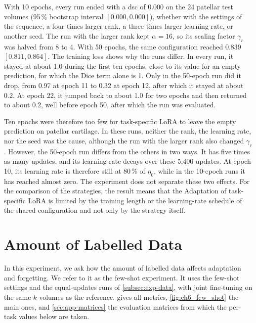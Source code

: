 With 10 epochs, every run ended with a \gls{dsc} of 0.000 on the 24 patellar test volumes (95\,\% bootstrap interval $[0.000, 0.000]$), whether with the settings of the sequence, a four times larger rank, a three times larger learning rate, or another seed.
The run with the larger rank kept $\alpha = 16$, so its scaling factor $\gamma_r$ was halved from 8 to 4.
With 50 epochs, the same configuration reached 0.839 $[0.811, 0.864]$.
The training loss shows why the runs differ.
In every run, it stayed at about 1.0 during the first ten epochs, close to its value for an empty prediction, for which the Dice term alone is 1.
Only in the 50-epoch run did it drop, from 0.97 at epoch 11 to 0.32 at epoch 12, after which it stayed at about 0.2.
At epoch 22, it jumped back to about 1.0 for two epochs and then returned to about 0.2, well before epoch 50, after which the run was evaluated.

Ten epochs were therefore too few for task-specific LoRA to leave the empty prediction on patellar cartilage.
In these runs, neither the rank, the learning rate, nor the seed was the cause, although the run with the larger rank also changed $\gamma_r$.
However, the 50-epoch run differs from the others in two ways.
It has five times as many updates, and its learning rate decays over these 5{,}400 updates.
At epoch 10, its learning rate is therefore still at 80\,\% of $\eta_0$, while in the 10-epoch runs it has reached almost zero.
The experiment does not separate these two effects.
For the comparison of the strategies, the result means that the Adaptation of task-specific LoRA is limited by the training length or the learning-rate schedule of the shared configuration and not only by the strategy itself.

\section{Amount of Labelled Data}
\label{sec:exp-few-shot}
In this experiment, we ask how the amount of labelled data affects adaptation and forgetting.
We refer to it as the few-shot experiment.
It uses the few-shot settings and the equal-updates runs of \cref{subsec:exp-data}, with joint fine-tuning on the same $k$ volumes as the reference.
 gives all metrics, \cref{fig:ch6_few_shot} the main ones, and \cref{sec:app-matrices} the evaluation matrices from which the per-task values below are taken.

